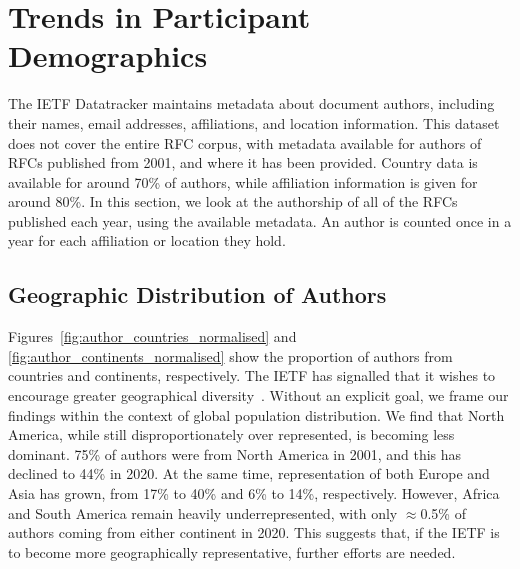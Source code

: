 \documentclass[twocolumn,10pt]{article}
\begin{document}
\section{Trends in Participant Demographics}
\label{sec:trends-demographics}



The IETF Datatracker maintains metadata about document authors, including
their names, email addresses, affiliations, and location information. This
dataset does not cover the entire RFC corpus, with metadata available for
authors of RFCs published from 2001, and where it has been provided.
Country data is available for around 70\% of authors, while affiliation
information is given for around 80\%. In this section, we look at the
authorship of all of the RFCs published each year, using the available
metadata. An author is counted once in a year for each affiliation or
location they hold.

\subsection{Geographic Distribution of Authors}
Figures~\ref{fig:author_countries_normalised} and
\ref{fig:author_continents_normalised} show the proportion of authors from
countries and continents, respectively. The IETF has signalled that it
wishes to encourage greater geographical diversity~\cite{rfc7704,
ietfblog:diversity}. Without an explicit goal, we frame our findings within
the context of global population distribution.  We find that North America,
while still disproportionately over represented, is becoming less dominant.
75\% of authors were from North America in 2001, and this has declined to
44\% in 2020. At the same time, representation of both Europe and Asia has
grown, from 17\% to 40\% and 6\% to 14\%, respectively.  However, Africa
and South America remain heavily underrepresented, with only $\approx$0.5\%
of authors coming from either continent in 2020.  This suggests that, if
the IETF is to become more geographically representative, further efforts
are needed.
\end{document}
